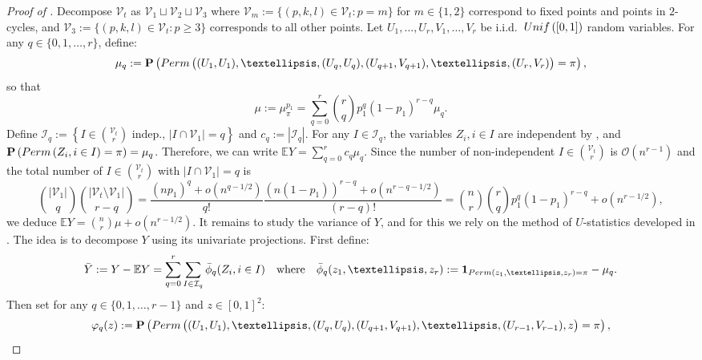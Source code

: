 \documentclass{article}
\theoremstyle{remark}
\def\m{\!-\!}
\def\mm{\!\!-\!\!}
\def\O{\mathcal{O}}
\newcommand{\card}[1]{\left|#1\right|}
\def\E{\mathbb{E}}
\newcommand{\prob}[1]{\mathbf{P}\left(#1\right)}
\newcommand{\One}[1]{\mathbf{1}_{#1}}
\newcommand{\Unif}[1]{{\rm Unif}\left(#1\right)}
\def\carre{[0,1]^2}
\newcommand{\perm}[1]{{\rm Perm}\left(#1\right)}
\def\Vert{\mathcal{V}}
\begin{document}
\begin{proof}[Proof of ]
    Decompose $\Vert_t$ as $\Vert_1\sqcup \Vert_2\sqcup \Vert_3$ where $\Vert_m := \{(p,k,l)\in\Vert_t : p=m\}$ for $m\in\{1,2\}$ correspond to fixed points and points in $2$-cycles, and $\Vert_3 := \{(p,k,l)\in\Vert_t : p\ge3\}$ corresponds to all other points.
    Let $U_1, \dots, U_r, V_1, \dots, V_r$ be i.i.d.~$\Unif{[0,1]}$ random variables.
    For any $q\in \{0,1,\dots,r\}$, define:
    \begin{equation*}
    \mu_{q}:=\prob{\perm{\big. (U_1,U_1), \dots, (U_q,U_q), (U_{q+1},V_{q+1}), \dots, (U_r,V_r)}=\pi} ,
    \end{equation*}
    so that 
    \begin{equation*}
        \mu := \mu_\pi^{p_1} = \sum_{q=0}^r 
        \binom{r}{q}p_1^q(1-p_1)^{r-q}
        \mu_{q} .
    \end{equation*}
    Define $\mathcal{I}_q := \left\{ I\in\binom{\Vert_t}{r} \text{ indep., }\card{I\cap \Vert_1}=q \right\}$ and $c_q:=\card{\mathcal{I}_q}$.
    For any $I\in\mathcal{I}_q$, the variables $Z_i,i\in I$ are independent by , and $\prob{\perm{Z_i,i\in I}=\pi}=\mu_q$.
    Therefore, we can write $\E Y = \sum_{q=0}^r c_q \mu_{q}$.
    Since the number of non-independent $I\in\binom{\Vert_t}{r}$ is $\O(n^{r-1})$ and the total number of $I\in\binom{\Vert_t}{r}$ with $|I\cap \Vert_1|=q$ is 
    \begin{equation*}
        \binom{|\Vert_1|}{q}\binom{|\Vert_t\setminus \Vert_1|}{r-q} = \frac{(np_1)^q+o(n^{q\m 1/2})}{q!}\frac{(n(1\mm p_1))^{r\m q}+o(n^{r\m q\m 1/2})}{(r\m q)!} = \binom{n}{r}\binom{r}{q}p_1^q(1\mm p_1)^{r\m q} + o(n^{r\m 1/2}) ,
    \end{equation*}
    we deduce $\E Y = \binom{n}{r}\mu + o(n^{r-1/2})$.
    It remains to study the variance of $Y$, and for this we rely on the method of $U$-statistics developed in \cite{H48}.
    The idea is to decompose $Y$ using its univariate projections.
    First define:
    \begin{equation*}
        \bar Y := Y-\E Y = \sum_{q=0}^r\sum_{I\in\mathcal{I}_q}\bar\phi_q(Z_i,i\in I) 
        \quad\text{where}\quad
        \bar\phi_q(z_1,\dots,z_r):=\One{\perm{z_1,\dots,z_r}=\pi}-\mu_{q} .
    \end{equation*}
    Then set for any $q\in \{0,1,\dots,r\m1\}$ and $z\in\carre$:
    \begin{equation*}
        \varphi_q(z) := \prob{\perm{\big. (U_1,U_1), \dots, (U_q,U_q), (U_{q+1},V_{q+1}), \dots, (U_{r-1},V_{r-1}), z} = \pi} ,
    \end{equation*}

\end{proof}
\end{document}
